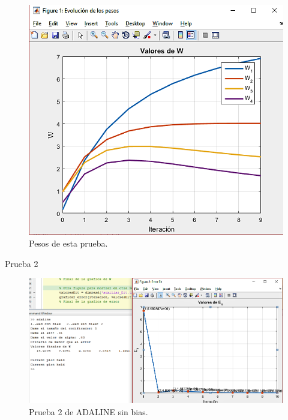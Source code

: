 \documentclass[12pt, titlepage]{article}
\begin{document}
            \begin{figure}[H]
                \begin{center}
                    \includegraphics[width=16cm]{img/adaline3/pesosbias.png}
                    \caption{Pesos de esta prueba.}
                    \label{fig:adaline3pesos}
                \end{center}
            \end{figure}
        Prueba 2
        \begin{figure}[H]
            \begin{center}
                \includegraphics[width=16cm]{img/adaline4/error.png}
                \caption{Prueba 2 de ADALINE sin bias.}
                \label{fig:adaline4error}
            \end{center}
        \end{figure}
        
\end{document}
